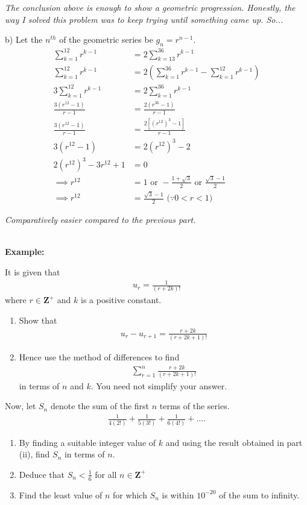 \documentclass[12pt, a4paper, titlepage]{article}
\begin{document}
\emph{The conclusion above is enough to show a geometric progression. Honestly, the way I solved this problem was to keep trying until something came up. So...}

b)
Let the $n^{th}$ of the geometric series be $g_n = r^{n - 1}$.
\begin{align*}
    \sum^{12}_{k = 1} r^{k - 1} &= 2 \sum^{36}_{k = 13} r^{k - 1} \\
    \sum^{12}_{k = 1} r^{k - 1} &= 2(\sum^{36}_{k = 1} r^{k - 1} - \sum^{12}_{k = 1} r^{k - 1}) \\
    3 \sum^{12}_{k = 1} r^{k - 1} &= 2\sum^{36}_{k = 1} r^{k - 1} \\
    \frac{3(r^{12} - 1)}{r - 1} &= \frac{2(r^{36} - 1)}{r - 1} \\
    \frac{3(r^{12} - 1)}{r - 1} &= \frac{2[(r^{12})^3 - 1]}{r - 1} \\
    3(r^{12} - 1) &= 2(r^{12})^3 - 2 \\
    2(r^{12})^3 - 3r^{12} + 1 &= 0 \\
    \implies r^{12} &= 1 \text{ or } -\frac{1 + \sqrt{3}}{2} \text{ or } \frac{\sqrt{3} - 1}{2} \\
    \implies r^{12} &= \frac{\sqrt{3} - 1}{2} \text{ (} \because 0 < r < 1 \text{)}
\end{align*}

\emph{Comparatively easier compared to the previous part.}

\textbf{\\ Example:}

It is given that
\begin{align*}
    u_r = \frac{1}{(r + 2k)!}
\end{align*}
where $r \in \mathbf{Z^+}$ and $k$ is a positive constant.
\begin{enumerate}[label=(\roman*)]
    \item Show that
    \begin{align*}
        u_r - u_{r + 1} = \frac{r + 2k}{(r + 2k + 1)!}
    \end{align*}
    \item Hence use the method of differences to find
    \begin{align*}
        \sum_{r = 1}^n \frac{r + 2k}{(r + 2k + 1)!}
    \end{align*}
    in terms of $n$ and $k$. You need not simplify your answer.
\end{enumerate}
Now, let $S_n$ denote the sum of the first $n$ terms of the series.
\begin{align*}
        \frac{1}{4(2!)} + \frac{1}{5(3!)} + \frac{1}{6(4!)} + \dots.
    \end{align*}
\begin{enumerate}[resume, label=(\roman*)]
    \item By finding a suitable integer value of $k$ and using the result obtained in part (ii), find $S_n$ in terms of $n$.
    \item Deduce that $S_n < \frac{1}{6}$ for all $n \in \mathbf{Z^+}$
    \item Find the least value of $n$ for which $S_n$ is within $10^{-20}$ of the sum to infinity.
\end{enumerate}
\end{document}

